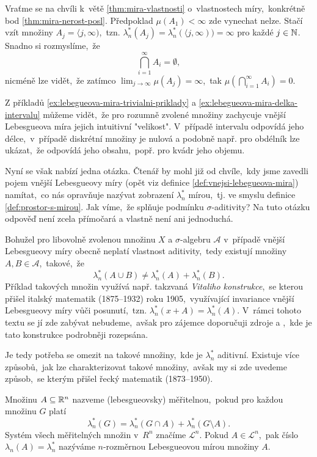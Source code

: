 \begin{remark}
    Vraťme se na chvíli k~větě \ref{thm:mira-vlastnosti} o~vlastnostech míry,~konkrétně bod \ref{thm:mira-nerost-posl}. Předpoklad $\mu(A_1)<\infty$ zde vynechat nelze. Stačí vzít množiny $A_j=\langle j,\infty)$,~tzn. $\lambda_n^*(A_j)=\lambda_n^*(\langle j,\infty))=\infty$ pro každé $j\in\mathbb{N}$. Snadno si rozmyslíme,~že
    \[\bigcap_{i=1}^\infty A_i=\emptyset,\]
    nicméně lze vidět,~že zatímco $\lim_{j\to\infty}\mu(A_j)=\infty$,~tak $\mu(\bigcap_{i=1}^\infty A_i)=0$.
\end{remark}

Z příkladů \ref{ex:lebegueova-mira-trivialni-priklady} a \ref{ex:lebegueova-mira-delka-intervalu} můžeme vidět,~že pro rozumně zvolené množiny zachycuje vnější Lebesgueova míra jejich intuitivní "velikost". V~případě intervalu odpovídá jeho délce,~v~případě diskrétní množiny je nulová a podobně např. pro obdélník lze ukázat,~že odpovídá jeho obsahu,~popř. pro kvádr jeho objemu.

Nyní se však nabízí jedna otázka. Čtenář by mohl již od chvíle,~kdy jsme zavedli pojem vnější Lebesgueovy míry (opět viz definice \ref{def:vnejsi-lebegueova-mira}) namítat,~co nás opravňuje nazývat zobrazení $\lambda_n^*$ mírou,~tj. ve smyslu definice \ref{def:prostor-s-mirou}. Jak víme,~že splňuje podmínku $\sigma$-aditivity? Na tuto otázku odpověď není zcela přímočará a vlastně není ani jednoduchá.

Bohužel pro libovolně zvolenou množinu $X$ a $\sigma$-algebru $\mathcal{A}$ v~případě vnější Lebesgueovy míry obecně neplatí vlastnost aditivity,~tedy existují množiny $A,B\in\mathcal{A}$,~takové,~že
\[\lambda_n^*(A\cup B)\neq\lambda_n^*(A)+\lambda_n^*(B).\]
Příklad takových množin využívá např. takzvaná \emph{Vitaliho konstrukce},~se kterou přišel italský matematik  (1875--1932) roku 1905,~využívající invariance vnější Lebesgueovy míry vůči posunutí,~tzn. $\lambda_n^*(x+A)=\lambda_n^*(A)$. \cite{OConnor2025} V~rámci tohoto textu se jí zde zabývat nebudeme,~avšak pro zájemce doporučuji zdroje \citep[str. 3]{Lukes2013} a \cite{Verner2025},~kde je tato konstrukce podrobněji rozepsána.

Je tedy potřeba se omezit na takové množiny,~kde je $\lambda_n^*$ aditivní. Existuje více způsobů,~jak lze charakterizovat takové množiny,~avšak my si zde uvedeme způsob,~se kterým přišel řecký matematik  (1873--1950).
\begin{definition}\label{def:lebesgueovska-meritelnost}
    Množinu $A\subseteq\mathbb{R}^n$ nazveme (lebesgueovsky) měřitelnou,~pokud pro každou množinu $G$ platí
    \[\lambda_n^*(G)=\lambda_n^*(G\cap A)+\lambda_n^*(G\setminus A).\]
    Systém všech měřitelných množin v~$R^n$ značíme $\mathcal{L}^n$.  Pokud $A\in\mathcal{L}^n$,~pak číslo $\lambda_n(A)=\lambda_n^*$ nazýváme $n$-rozměrnou Lebesgueovou mírou množiny $A$.
\end{definition}

